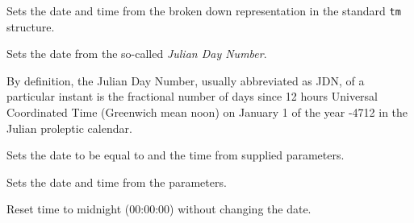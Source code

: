 

\label{wxdatetimesettm}


Sets the date and time from the broken down representation in the standard
{\tt tm} structure.



\label{wxdatetimesetjdn}


Sets the date from the so-called {\it Julian Day Number}.

By definition, the Julian Day Number, usually abbreviated as JDN, of a
particular instant is the fractional number of days since 12 hours Universal
Coordinated Time (Greenwich mean noon) on January 1 of the year -4712 in the
Julian proleptic calendar.



\label{wxdatetimesettime}


Sets the date to be equal to  and the time
from supplied parameters.



\label{wxdatetimesetdate}


Sets the date and time from the parameters.


\label{wxdatetimeresettime}


Reset time to midnight (00:00:00) without changing the date.


\label{wxdatetimesetyear}

